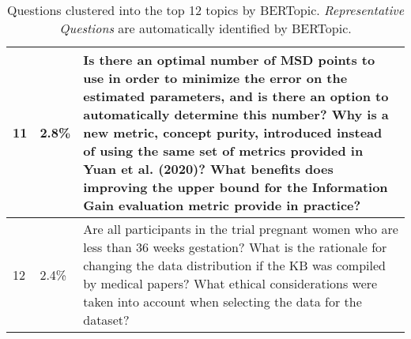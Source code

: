 \begin{table*}[!ht]
\begin{tabularx}{\textwidth}{p{0.2cm}p{0.7cm}X}
11 & 2.8\% & Is there an optimal number of MSD points to use in order to minimize the error on the estimated parameters, and is there an option to automatically determine this number? Why is a new metric, concept purity, introduced instead of using the same set of metrics provided in Yuan et al. (2020)? What benefits does improving the upper bound for the Information Gain evaluation metric provide in practice? \\
\midrule
12 & 2.4\% & Are all participants in the trial pregnant women who are less than 36 weeks gestation? What is the rationale for changing the data distribution if the KB was compiled by medical papers? What ethical considerations were taken into account when selecting the data for the dataset? \\ 
\bottomrule
\end{tabularx}
\caption{Questions clustered into the top 12 topics by BERTopic. \textit{Representative Questions} are automatically identified by BERTopic.}
\label{tbl:question-topics}
\end{table*}